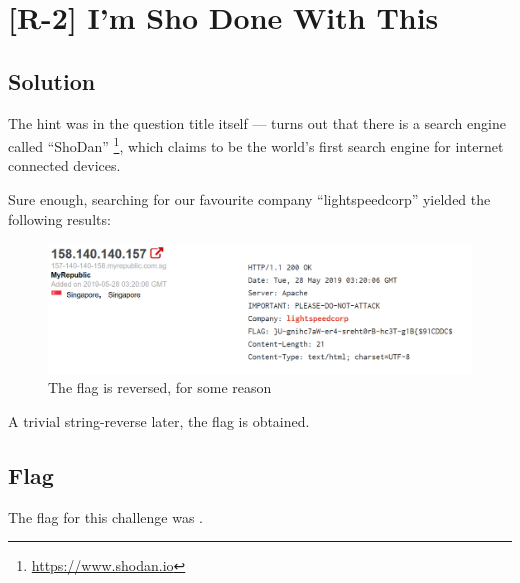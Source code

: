 

\pagebreak
\section{[R-2] I'm Sho Done With This}

	\subsection{Solution}

		The hint was in the question title itself --- turns out that there is a search engine called \enquote{ShoDan}
		\footnote{\url{https://www.shodan.io}}, which claims to be the world's first search engine for internet connected devices.

		Sure enough, searching for our favourite company \enquote{lightspeedcorp} yielded the following results:

		\begin{figure}[!htbp]\centering
			\includegraphics[width=150mm]{figures/osintred/r2.png} \vspace{5mm}
			\caption{The flag is reversed, for some reason}
		\end{figure}

		A trivial string-reverse later, the flag is obtained.


	\subsection{Flag}
		The flag for this challenge was .

















